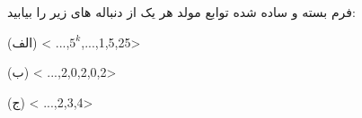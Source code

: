 	\p
	فرم بسته و ساده شده توابع مولد هر یک از دنباله های زیر را بیابید:
			
			(الف) < ...,$5^k$,...,1,5,25>
			
			(ب) < ...,2,0,2,0,2>
			
								(ج) < ...,2,3,4>